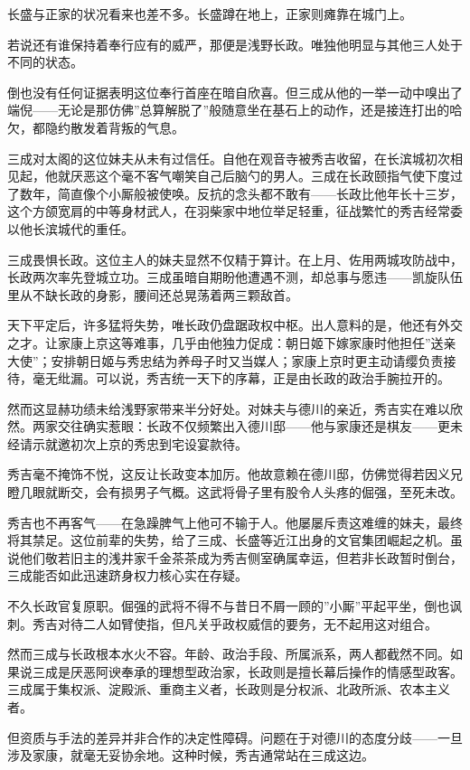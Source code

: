 \documentclass[
]{article}
\begin{document}
长盛与正家的状况看来也差不多。长盛蹲在地上，正家则瘫靠在城门上。

若说还有谁保持着奉行应有的威严，那便是浅野长政。唯独他明显与其他三人处于不同的状态。

倒也没有任何证据表明这位奉行首座在暗自欣喜。但三成从他的一举一动中嗅出了端倪------无论是那仿佛''总算解脱了''般随意坐在基石上的动作，还是接连打出的哈欠，都隐约散发着背叛的气息。

三成对太阁的这位妹夫从未有过信任。自他在观音寺被秀吉收留，在长滨城初次相见起，他就厌恶这个毫不客气嘲笑自己后脑勺的男人。三成在长政颐指气使下度过了数年，简直像个小厮般被使唤。反抗的念头都不敢有------长政比他年长十三岁，这个方颌宽肩的中等身材武人，在羽柴家中地位举足轻重，征战繁忙的秀吉经常委以他长滨城代的重任。

三成畏惧长政。这位主人的妹夫显然不仅精于算计。在上月、佐用两城攻防战中，长政两次率先登城立功。三成虽暗自期盼他遭遇不测，却总事与愿违------凯旋队伍里从不缺长政的身影，腰间还总晃荡着两三颗敌首。

天下平定后，许多猛将失势，唯长政仍盘踞政权中枢。出人意料的是，他还有外交之才。让家康上京这等难事，几乎由他独力促成：朝日姬下嫁家康时他担任''送亲大使''；安排朝日姬与秀忠结为养母子时又当媒人；家康上京时更主动请缨负责接待，毫无纰漏。可以说，秀吉统一天下的序幕，正是由长政的政治手腕拉开的。

然而这显赫功绩未给浅野家带来半分好处。对妹夫与德川的亲近，秀吉实在难以欣然。两家交往确实惹眼：长政不仅频繁出入德川邸------他与家康还是棋友------更未经请示就邀初次上京的秀忠到宅设宴款待。

秀吉毫不掩饰不悦，这反让长政变本加厉。他故意赖在德川邸，仿佛觉得若因义兄瞪几眼就断交，会有损男子气概。这武将骨子里有股令人头疼的倔强，至死未改。

秀吉也不再客气------在急躁脾气上他可不输于人。他屡屡斥责这难缠的妹夫，最终将其禁足。这位前辈的失势，给了三成、长盛等近江出身的文官集团崛起之机。虽说他们敬若旧主的浅井家千金茶茶成为秀吉侧室确属幸运，但若非长政暂时倒台，三成能否如此迅速跻身权力核心实在存疑。

不久长政官复原职。倔强的武将不得不与昔日不屑一顾的''小厮''平起平坐，倒也讽刺。秀吉对待二人如臂使指，但凡关乎政权威信的要务，无不起用这对组合。

然而三成与长政根本水火不容。年龄、政治手段、所属派系，两人都截然不同。如果说三成是厌恶阿谀奉承的理想型政治家，长政则是擅长幕后操作的情感型政客。三成属于集权派、淀殿派、重商主义者，长政则是分权派、北政所派、农本主义者。

但资质与手法的差异并非合作的决定性障碍。问题在于对德川的态度分歧------一旦涉及家康，就毫无妥协余地。这种时候，秀吉通常站在三成这边。
\end{document}
